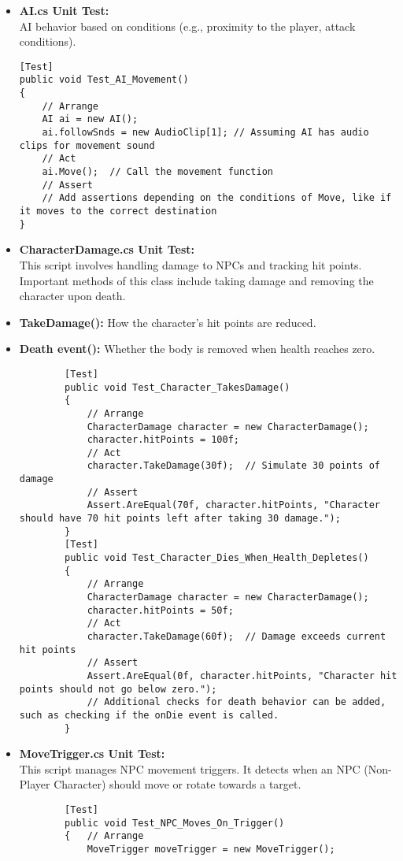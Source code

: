 \begin{itemize}
	\item  \textbf{AI.cs Unit Test:}
	\\
	AI behavior based on conditions (e.g., proximity to the player, attack conditions).
	\begin{lstlisting}
[Test]
public void Test_AI_Movement()
{
	// Arrange
	AI ai = new AI();
	ai.followSnds = new AudioClip[1]; // Assuming AI has audio clips for movement sound
	// Act
	ai.Move();  // Call the movement function
	// Assert
	// Add assertions depending on the conditions of Move, like if it moves to the correct destination
}
	\end{lstlisting}
	\item  \textbf{CharacterDamage.cs Unit Test:}
	\\
	This script involves handling damage to NPCs and tracking hit points. Important methods of this class include taking damage and removing the character upon death.
	\item \textbf{TakeDamage():} How the character's hit points are reduced.
	\item \textbf{Death event():} Whether the body is removed when health reaches zero.
	\begin{lstlisting}
		[Test]
		public void Test_Character_TakesDamage()
		{
			// Arrange
			CharacterDamage character = new CharacterDamage();
			character.hitPoints = 100f;
			// Act
			character.TakeDamage(30f);  // Simulate 30 points of damage
			// Assert
			Assert.AreEqual(70f, character.hitPoints, "Character should have 70 hit points left after taking 30 damage.");
		}
		[Test]
		public void Test_Character_Dies_When_Health_Depletes()
		{
			// Arrange
			CharacterDamage character = new CharacterDamage();
			character.hitPoints = 50f;
			// Act
			character.TakeDamage(60f);  // Damage exceeds current hit points
			// Assert
			Assert.AreEqual(0f, character.hitPoints, "Character hit points should not go below zero.");
			// Additional checks for death behavior can be added, such as checking if the onDie event is called.
		}
	\end{lstlisting}
	\item \textbf{ MoveTrigger.cs Unit Test:}
	\\
	This script manages NPC movement triggers. It detects when an NPC (Non-Player Character) should move or rotate towards a target.
	\begin{lstlisting}
		[Test]
		public void Test_NPC_Moves_On_Trigger()
		{   // Arrange
			MoveTrigger moveTrigger = new MoveTrigger();

\end{lstlisting}
\end{itemize}
